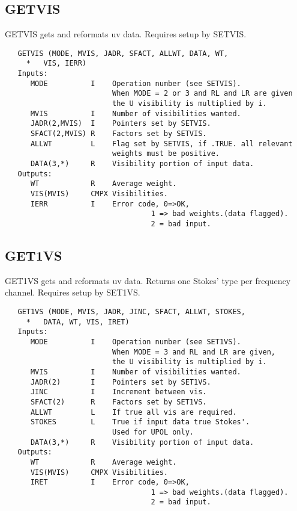 \subsection{GETVIS}
GETVIS gets and reformats uv data. Requires setup by SETVIS.
\begin{verbatim}
   GETVIS (MODE, MVIS, JADR, SFACT, ALLWT, DATA, WT,
     *   VIS, IERR)
   Inputs:
      MODE          I    Operation number (see SETVIS).
                         When MODE = 2 or 3 and RL and LR are given
                         the U visibility is multiplied by i.
      MVIS          I    Number of visibilities wanted.
      JADR(2,MVIS)  I    Pointers set by SETVIS.
      SFACT(2,MVIS) R    Factors set by SETVIS.
      ALLWT         L    Flag set by SETVIS, if .TRUE. all relevant
                         weights must be positive.
      DATA(3,*)     R    Visibility portion of input data.
   Outputs:
      WT            R    Average weight.
      VIS(MVIS)     CMPX Visibilities.
      IERR          I    Error code, 0=>OK,
                                  1 => bad weights.(data flagged).
                                  2 = bad input.
\end{verbatim}

\subsection{GET1VS}
GET1VS gets and reformats uv data. Returns one Stokes' type per
frequency channel.  Requires setup by SET1VS.
\begin{verbatim}
   GET1VS (MODE, MVIS, JADR, JINC, SFACT, ALLWT, STOKES,
     *   DATA, WT, VIS, IRET)
   Inputs:
      MODE          I    Operation number (see SET1VS).
                         When MODE = 3 and RL and LR are given,
                         the U visibility is multiplied by i.
      MVIS          I    Number of visibilities wanted.
      JADR(2)       I    Pointers set by SET1VS.
      JINC          I    Increment between vis.
      SFACT(2)      R    Factors set by SET1VS.
      ALLWT         L    If true all vis are required.
      STOKES        L    True if input data true Stokes'.
                         Used for UPOL only.
      DATA(3,*)     R    Visibility portion of input data.
   Outputs:
      WT            R    Average weight.
      VIS(MVIS)     CMPX Visibilities.
      IRET          I    Error code, 0=>OK,
                                  1 => bad weights.(data flagged).
                                  2 = bad input.
\end{verbatim}



